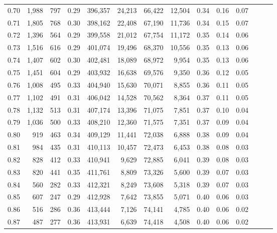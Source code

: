 \begin{tabular}{rrrrrrrrrrrrrr}
0.70 &   1,988 &    797 &  0.29 &  396,357 &   24,213 &  66,422 &  12,504 &  0.34 &  0.16 &      0.07 \\
0.71 &   1,805 &    768 &  0.30 &  398,162 &   22,408 &  67,190 &  11,736 &  0.34 &  0.15 &      0.07 \\
0.72 &   1,396 &    564 &  0.29 &  399,558 &   21,012 &  67,754 &  11,172 &  0.35 &  0.14 &      0.06 \\
0.73 &   1,516 &    616 &  0.29 &  401,074 &   19,496 &  68,370 &  10,556 &  0.35 &  0.13 &      0.06 \\
0.74 &   1,407 &    602 &  0.30 &  402,481 &   18,089 &  68,972 &   9,954 &  0.35 &  0.13 &      0.06 \\
0.75 &   1,451 &    604 &  0.29 &  403,932 &   16,638 &  69,576 &   9,350 &  0.36 &  0.12 &      0.05 \\
0.76 &   1,008 &    495 &  0.33 &  404,940 &   15,630 &  70,071 &   8,855 &  0.36 &  0.11 &      0.05 \\
0.77 &   1,102 &    491 &  0.31 &  406,042 &   14,528 &  70,562 &   8,364 &  0.37 &  0.11 &      0.05 \\
0.78 &   1,132 &    513 &  0.31 &  407,174 &   13,396 &  71,075 &   7,851 &  0.37 &  0.10 &      0.04 \\
0.79 &   1,036 &    500 &  0.33 &  408,210 &   12,360 &  71,575 &   7,351 &  0.37 &  0.09 &      0.04 \\
0.80 &     919 &    463 &  0.34 &  409,129 &   11,441 &  72,038 &   6,888 &  0.38 &  0.09 &      0.04 \\
0.81 &     984 &    435 &  0.31 &  410,113 &   10,457 &  72,473 &   6,453 &  0.38 &  0.08 &      0.03 \\
0.82 &     828 &    412 &  0.33 &  410,941 &    9,629 &  72,885 &   6,041 &  0.39 &  0.08 &      0.03 \\
0.83 &     820 &    441 &  0.35 &  411,761 &    8,809 &  73,326 &   5,600 &  0.39 &  0.07 &      0.03 \\
0.84 &     560 &    282 &  0.33 &  412,321 &    8,249 &  73,608 &   5,318 &  0.39 &  0.07 &      0.03 \\
0.85 &     607 &    247 &  0.29 &  412,928 &    7,642 &  73,855 &   5,071 &  0.40 &  0.06 &      0.03 \\
0.86 &     516 &    286 &  0.36 &  413,444 &    7,126 &  74,141 &   4,785 &  0.40 &  0.06 &      0.02 \\
0.87 &     487 &    277 &  0.36 &  413,931 &    6,639 &  74,418 &   4,508 &  0.40 &  0.06 &      0.02 \\

\end{tabular}
